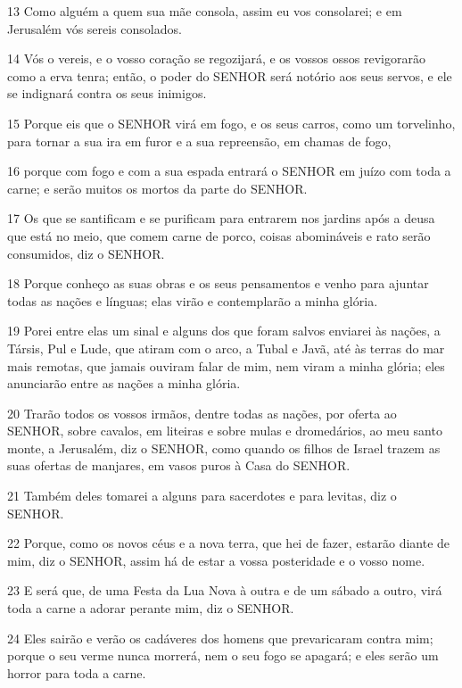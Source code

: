 \par 13 Como alguém a quem sua mãe consola, assim eu vos consolarei; e em Jerusalém vós sereis consolados.
\par 14 Vós o vereis, e o vosso coração se regozijará, e os vossos ossos revigorarão como a erva tenra; então, o poder do SENHOR será notório aos seus servos, e ele se indignará contra os seus inimigos.
\par 15 Porque eis que o SENHOR virá em fogo, e os seus carros, como um torvelinho, para tornar a sua ira em furor e a sua repreensão, em chamas de fogo,
\par 16 porque com fogo e com a sua espada entrará o SENHOR em juízo com toda a carne; e serão muitos os mortos da parte do SENHOR.
\par 17 Os que se santificam e se purificam para entrarem nos jardins após a deusa que está no meio, que comem carne de porco, coisas abomináveis e rato serão consumidos, diz o SENHOR.
\par 18 Porque conheço as suas obras e os seus pensamentos e venho para ajuntar todas as nações e línguas; elas virão e contemplarão a minha glória.
\par 19 Porei entre elas um sinal e alguns dos que foram salvos enviarei às nações, a Társis, Pul e Lude, que atiram com o arco, a Tubal e Javã, até às terras do mar mais remotas, que jamais ouviram falar de mim, nem viram a minha glória; eles anunciarão entre as nações a minha glória.
\par 20 Trarão todos os vossos irmãos, dentre todas as nações, por oferta ao SENHOR, sobre cavalos, em liteiras e sobre mulas e dromedários, ao meu santo monte, a Jerusalém, diz o SENHOR, como quando os filhos de Israel trazem as suas ofertas de manjares, em vasos puros à Casa do SENHOR.
\par 21 Também deles tomarei a alguns para sacerdotes e para levitas, diz o SENHOR.
\par 22 Porque, como os novos céus e a nova terra, que hei de fazer, estarão diante de mim, diz o SENHOR, assim há de estar a vossa posteridade e o vosso nome.
\par 23 E será que, de uma Festa da Lua Nova à outra e de um sábado a outro, virá toda a carne a adorar perante mim, diz o SENHOR.
\par 24 Eles sairão e verão os cadáveres dos homens que prevaricaram contra mim; porque o seu verme nunca morrerá, nem o seu fogo se apagará; e eles serão um horror para toda a carne.


